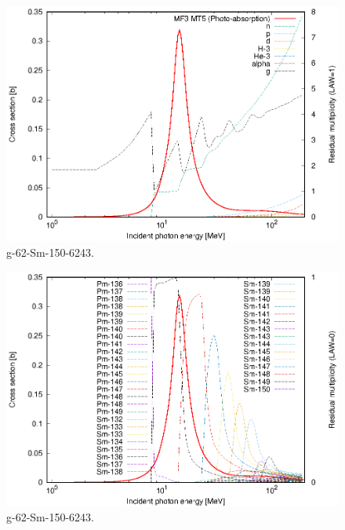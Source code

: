 \begin{figure}
 \includegraphics[width=\linewidth]{eps/g_62-Sm-150_6243.eps}
  \caption{g-62-Sm-150-6243.}
\end{figure}
\begin{figure}
 \includegraphics[width=\linewidth]{eps-law0/g_62-Sm-150_6243.eps}
 \caption{g-62-Sm-150-6243.}
\end{figure}
\newpage \clearpage

